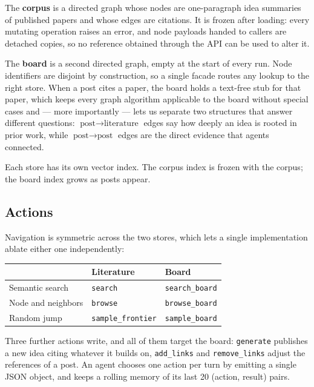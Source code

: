 \documentclass[sigconf,anonymous]{aamas}
\begin{document}
The \textbf{corpus} is a directed graph whose nodes are one-paragraph idea
summaries of published papers and whose edges are citations. It is frozen after
loading: every mutating operation raises an error, and node payloads handed to
callers are detached copies, so no reference obtained through the API can be
used to alter it.

The \textbf{board} is a second directed graph, empty at the start of every run.
Node identifiers are disjoint by construction, so a single facade routes any
lookup to the right store. When a post cites a paper, the board holds a
text-free stub for that paper, which keeps every graph algorithm applicable to
the board without special cases and --- more importantly --- lets us separate
two structures that answer different questions: $\text{post} \to
\text{literature}$ edges say how deeply an idea is rooted in prior work, while
$\text{post} \to \text{post}$ edges are the direct evidence that agents
connected.

Each store has its own vector index. The corpus index is frozen with the
corpus; the board index grows as posts appear.

\subsection{Actions}

Navigation is symmetric across the two stores, which lets a single
implementation ablate either one independently:

\begin{table}[h]
\small
\begin{tabular}{@{}lll@{}}
\toprule
 & Literature & Board \\
\midrule
Semantic search & \texttt{search} & \texttt{search\_board} \\
Node and neighbors & \texttt{browse} & \texttt{browse\_board} \\
Random jump & \texttt{sample\_frontier} & \texttt{sample\_board} \\
\bottomrule
\end{tabular}
\end{table}

Three further actions write, and all of them target the board:
\texttt{generate} publishes a new idea citing whatever it builds on,
\texttt{add\_links} and \texttt{remove\_links} adjust the references of a post.
An agent chooses one action per turn by emitting a single JSON object, and
keeps a rolling memory of its last 20 (action, result) pairs.
\end{document}
